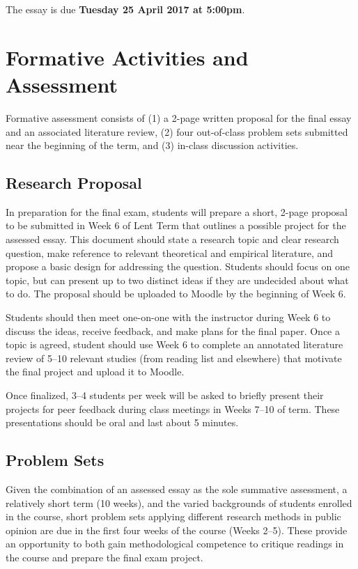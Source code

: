 \documentclass[12pt,a4paper]{article}
\begin{document}
\vspace{1em}

\noindent The essay is due \textbf{Tuesday 25 April 2017 at 5:00pm}.


\section{Formative Activities and Assessment}

Formative assessment consists of (1) a 2-page written proposal for the final essay and an associated literature review, (2) four out-of-class problem sets submitted near the beginning of the term, and (3) in-class discussion activities.

\subsection{Research Proposal}

In preparation for the final exam, students will prepare a short, 2-page proposal to be submitted in Week 6 of Lent Term that outlines a possible project for the assessed essay. This document should state a research topic and clear research question, make reference to relevant theoretical and empirical literature, and propose a basic design for addressing the question. Students should focus on one topic, but can present up to two distinct ideas if they are undecided about what to do. The proposal should be uploaded to Moodle by the beginning of Week 6.

Students should then meet one-on-one with the instructor during Week 6 to discuss the ideas, receive feedback, and make plans for the final paper. Once a topic is agreed, student should use Week 6 to complete an annotated literature review of 5--10 relevant studies (from reading list and elsewhere) that motivate the final project and upload it to Moodle.

Once finalized, 3--4 students per week will be asked to briefly present their projects for peer feedback during class meetings in Weeks 7--10 of term. These presentations should be oral and last about 5 minutes.

\subsection{Problem Sets}

Given the combination of an assessed essay as the sole summative assessment, a relatively short term (10 weeks), and the varied backgrounds of students enrolled in the course, short problem sets applying different research methods in public opinion are due in the first four weeks of the course (Weeks 2--5). These provide an opportunity to both gain methodological competence to critique readings in the course and prepare the final exam project.
\end{document}
